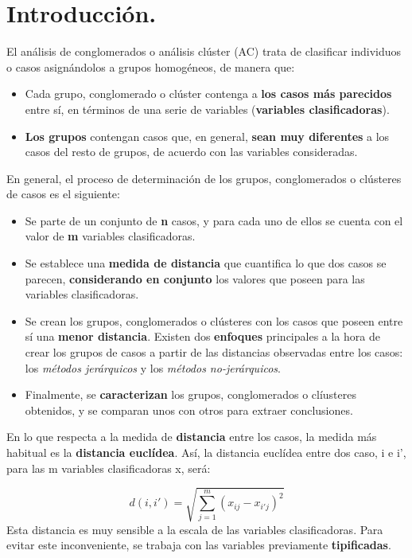 \documentclass[
]{book}
\providecommand{\tightlist}{%
  \setlength{\itemsep}{0pt}\setlength{\parskip}{0pt}}
\begin{document}
\section{Introducción.}\label{introducciuxf3n.-2}

El análisis de conglomerados o análisis clúster (AC) trata de clasificar individuos o casos asignándolos a grupos homogéneos, de manera que:

\begin{itemize}
\item
  Cada grupo, conglomerado o clúster contenga a \textbf{los casos más parecidos} entre sí, en términos de una serie de variables (\textbf{variables clasificadoras}).
\item
  \textbf{Los grupos} contengan casos que, en general, \textbf{sean muy diferentes} a los casos del resto de grupos, de acuerdo con las variables consideradas.
\end{itemize}

En general, el proceso de determinación de los grupos, conglomerados o clústeres de casos es el siguiente:

\begin{itemize}
\tightlist
\item
  Se parte de un conjunto de \textbf{n} casos, y para cada uno de ellos se cuenta con el valor de \textbf{m} variables clasificadoras.
\item
  Se establece una \textbf{medida de distancia} que cuantifica lo que dos casos se parecen, \textbf{considerando en conjunto} los valores que poseen para las variables clasificadoras.
\item
  Se crean los grupos, conglomerados o clústeres con los casos que poseen entre sí una \textbf{menor distancia}. Existen dos \textbf{enfoques} principales a la hora de crear los grupos de casos a partir de las distancias observadas entre los casos: los \emph{métodos jerárquicos} y los \emph{métodos no-jerárquicos}.
\item
  Finalmente, se \textbf{caracterizan} los grupos, conglomerados o clíusteres obtenidos, y se comparan unos con otros para extraer conclusiones.
\end{itemize}

En lo que respecta a la medida de \textbf{distancia} entre los casos, la medida más habitual es la \textbf{distancia euclídea}. Así, la distancia euclídea entre dos caso, i e i', para las m variables clasificadoras x, será:

\[
d(i, i') = \sqrt{\sum_{j=1}^{m} (x_{ij} - x_{i'j})^2}
\] Esta distancia es muy sensible a la escala de las variables clasificadoras. Para evitar este inconveniente, se trabaja con las variables previamente \textbf{tipificadas}.
\end{document}
